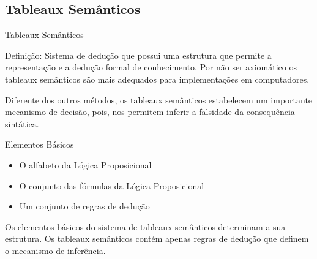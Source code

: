 
\subsection{Tableaux Semânticos}

\begin{frame}[t]

\vskip 3cm

\begin{center}
{\Huge Tableaux Semânticos}
\end{center}

\end{frame}







\begin{frame}{Definição:}
Sistema de dedução que possui uma estrutura que permite a representação e a 
dedução formal de conhecimento. Por não ser axiomático os tableaux semânticos 
são mais adequados para implementações em computadores.
\vspace{0,7 cm}

Diferente dos outros métodos, os tableaux semânticos estabelecem um importante mecanismo de decisão, pois, nos permitem inferir a falsidade da consequência sintática.
\end{frame}








\begin{frame}{Elementos Básicos}
\begin{itemize}
\item O alfabeto da Lógica Proposicional
\item O conjunto das fórmulas da Lógica Proposicional
\item Um conjunto de regras de dedução
\end{itemize}
\vspace{0,7 cm}
Os elementos básicos do sistema de tableaux semânticos determinam a sua estrutura. 
Os tableaux semânticos contém apenas regras de dedução que definem o mecanismo 
de inferência.
\end{frame}

